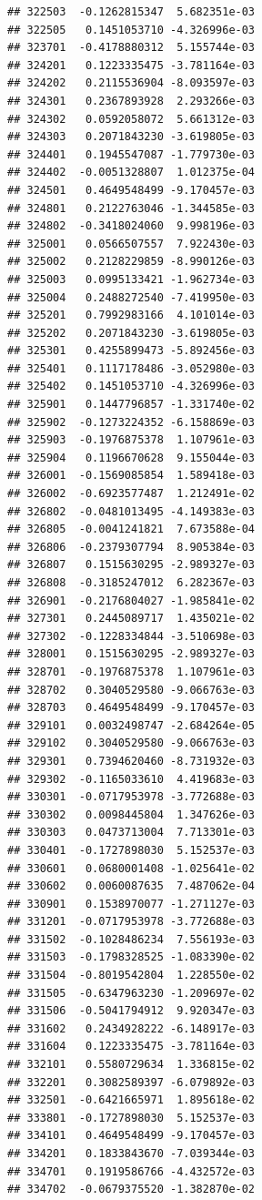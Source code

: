 \documentclass[ignorenonframetext,]{beamer}
\begin{document}
\begin{frame}[fragile]
\begin{verbatim}
## 322503  -0.1262815347  5.682351e-03
## 322505   0.1451053710 -4.326996e-03
## 323701  -0.4178880312  5.155744e-03
## 324201   0.1223335475 -3.781164e-03
## 324202   0.2115536904 -8.093597e-03
## 324301   0.2367893928  2.293266e-03
## 324302   0.0592058072  5.661312e-03
## 324303   0.2071843230 -3.619805e-03
## 324401   0.1945547087 -1.779730e-03
## 324402  -0.0051328807  1.012375e-04
## 324501   0.4649548499 -9.170457e-03
## 324801   0.2122763046 -1.344585e-03
## 324802  -0.3418024060  9.998196e-03
## 325001   0.0566507557  7.922430e-03
## 325002   0.2128229859 -8.990126e-03
## 325003   0.0995133421 -1.962734e-03
## 325004   0.2488272540 -7.419950e-03
## 325201   0.7992983166  4.101014e-03
## 325202   0.2071843230 -3.619805e-03
## 325301   0.4255899473 -5.892456e-03
## 325401   0.1117178486 -3.052980e-03
## 325402   0.1451053710 -4.326996e-03
## 325901   0.1447796857 -1.331740e-02
## 325902  -0.1273224352 -6.158869e-03
## 325903  -0.1976875378  1.107961e-03
## 325904   0.1196670628  9.155044e-03
## 326001  -0.1569085854  1.589418e-03
## 326002  -0.6923577487  1.212491e-02
## 326802  -0.0481013495 -4.149383e-03
## 326805  -0.0041241821  7.673588e-04
## 326806  -0.2379307794  8.905384e-03
## 326807   0.1515630295 -2.989327e-03
## 326808  -0.3185247012  6.282367e-03
## 326901  -0.2176804027 -1.985841e-02
## 327301   0.2445089717  1.435021e-02
## 327302  -0.1228334844 -3.510698e-03
## 328001   0.1515630295 -2.989327e-03
## 328701  -0.1976875378  1.107961e-03
## 328702   0.3040529580 -9.066763e-03
## 328703   0.4649548499 -9.170457e-03
## 329101   0.0032498747 -2.684264e-05
## 329102   0.3040529580 -9.066763e-03
## 329301   0.7394620460 -8.731932e-03
## 329302  -0.1165033610  4.419683e-03
## 330301  -0.0717953978 -3.772688e-03
## 330302   0.0098445804  1.347626e-03
## 330303   0.0473713004  7.713301e-03
## 330401  -0.1727898030  5.152537e-03
## 330601   0.0680001408 -1.025641e-02
## 330602   0.0060087635  7.487062e-04
## 330901   0.1538970077 -1.271127e-03
## 331201  -0.0717953978 -3.772688e-03
## 331502  -0.1028486234  7.556193e-03
## 331503  -0.1798328525 -1.083390e-02
## 331504  -0.8019542804  1.228550e-02
## 331505  -0.6347963230 -1.209697e-02
## 331506  -0.5041794912  9.920347e-03
## 331602   0.2434928222 -6.148917e-03
## 331604   0.1223335475 -3.781164e-03
## 332101   0.5580729634  1.336815e-02
## 332201   0.3082589397 -6.079892e-03
## 332501  -0.6421665971  1.895618e-02
## 333801  -0.1727898030  5.152537e-03
## 334101   0.4649548499 -9.170457e-03
## 334201   0.1833843670 -7.039344e-03
## 334701   0.1919586766 -4.432572e-03
## 334702  -0.0679375520 -1.382870e-02

\end{verbatim}
\end{frame}
\end{document}
